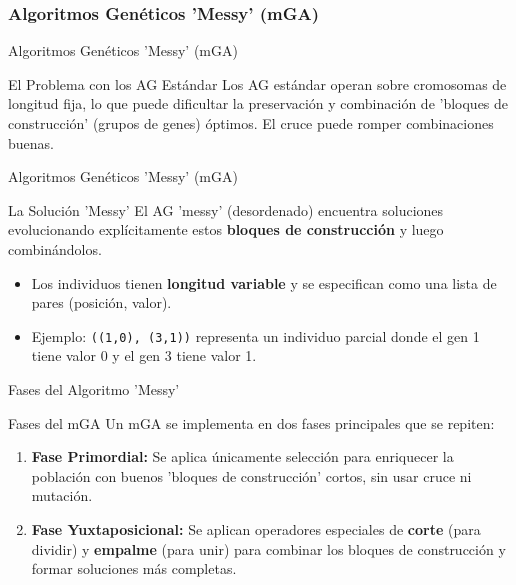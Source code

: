 \documentclass[aspectratio=169,xcolor=dvipsnames]{beamer}
\begin{document}
\subsubsection{Algoritmos Genéticos 'Messy' (mGA)}

\begin{frame}{Algoritmos Genéticos 'Messy' (mGA)}
    \begin{block}{El Problema con los AG Estándar}
    Los AG estándar operan sobre cromosomas de longitud fija, lo que puede dificultar la preservación y combinación de 'bloques de construcción' (grupos de genes) óptimos. El cruce puede romper combinaciones buenas.
    \end{block}
\end{frame}

\begin{frame}{Algoritmos Genéticos 'Messy' (mGA)}
    \begin{alertblock}{La Solución 'Messy'}
    El AG 'messy' (desordenado) encuentra soluciones evolucionando explícitamente estos \textbf{bloques de construcción} y luego combinándolos.
    \begin{itemize}
        \item Los individuos tienen \textbf{longitud variable} y se especifican como una lista de pares (posición, valor).
        \item Ejemplo: \texttt{((1,0), (3,1))} representa un individuo parcial donde el gen 1 tiene valor 0 y el gen 3 tiene valor 1.
    \end{itemize}
    \end{alertblock}
\end{frame}


\begin{frame}{Fases del Algoritmo 'Messy'}
    \begin{block}{Fases del mGA}
    Un mGA se implementa en dos fases principales que se repiten:
        \begin{enumerate}
            \item \textbf{Fase Primordial:} Se aplica únicamente selección para enriquecer la población con buenos 'bloques de construcción' cortos, sin usar cruce ni mutación.
            \pause
            \item \textbf{Fase Yuxtaposicional:} Se aplican operadores especiales de \textbf{corte} (para dividir) y \textbf{empalme} (para unir) para combinar los bloques de construcción y formar soluciones más completas.
        \end{enumerate}
    \end{block}
\end{frame}
\end{document}
